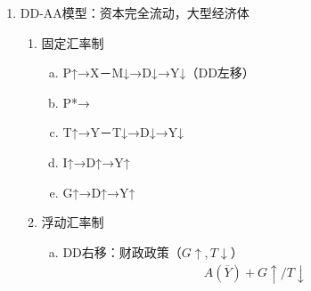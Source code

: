 \documentclass[12pt]{book}
\begin{document}
\begin{enumerate}[1.]
\begin{enumerate}[(1)]
\begin{enumerate}[a.]
\begin{gather*}
\begin{matrix}
                \end{matrix}\right.
            \end{gather*}
        \end{enumerate}
        \item 浮动汇率制（财政政策无效）
        \begin{enumerate}[a.]
            \item IS*右移：财政政策（ $G↑/T↓$ ），贸易政策（限制进口配额+关税）
            \begin{gather*}
                A(\overline{Y})
                \Rightarrow \begin{Bmatrix} 
                    G\uparrow/T\downarrow
                    \Rightarrow e\downarrow
                    \Rightarrow NX\downarrow \\
                    \text{贸易限制}\Rightarrow NX\downarrow 
            \end{Bmatrix}
            \Rightarrow A(\overline{Y}) 
            \end{gather*}
            \item LM*右移：货币政策（ $M_s\uparrow$ ）
            \begin{gather*}
                A(\overline{Y})+M_s\uparrow \Rightarrow \text{资本流出}\Rightarrow e\uparrow\Rightarrow NX\uparrow\Rightarrow Y\uparrow \Rightarrow B(\overline{Y})  
            \end{gather*}
        \end{enumerate}
    \end{enumerate}
    \item DD-AA模型：资本完全流动，大型经济体
    \begin{enumerate}[(1)]
        \item 固定汇率制
        \begin{enumerate}[a.]
            \item P↑→X－M↓→D↓→Y↓（DD左移）
            \item P*→
            \item T↑→Y－T↓→D↓→Y↓
            \item I↑→D↑→Y↑
            \item G↑→D↑→Y↑
        \end{enumerate}
        \item 浮动汇率制
        \begin{enumerate}[a.]
            \item DD右移：财政政策（$G\uparrow,T\downarrow$）
            \begin{align*}
                A(\overline{Y})+G\uparrow/T\downarrow

\end{align*}
\end{enumerate}
\end{enumerate}
\end{enumerate}
\end{document}
